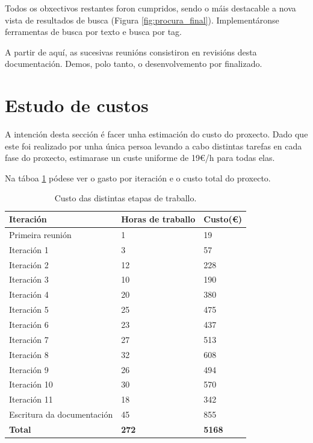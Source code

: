 Todos os obxectivos restantes foron cumpridos, sendo o máis destacable a nova vista de resultados de busca (Figura \ref{fig:procura_final}). Implementáronse ferramentas de busca por texto e busca por tag.

A partir de aquí, as sucesivas reunións consistiron en revisións desta documentación. Demos, polo tanto, o desenvolvemento por finalizado.



\section{Estudo de custos}

A intención desta sección é facer unha estimación do custo do proxecto. Dado que este foi realizado por unha única persoa levando a cabo distintas tarefas en cada fase do proxecto, estimarase un custe uniforme de 19€/h para todas elas. 

Na táboa \ref{tab:custo} pódese ver o gasto por iteración e o custo total do proxecto.

\begin{table}[h]
	\centering
	\begin{tabular}{|p{5cm}|l|l|}
		\hline
		\rowcolor{blue!10}
		Iteración & Horas de traballo & Custo(€)\\
		\hline
		Primeira reunión & 1 &  19\\
		\hline
		Iteración 1 & 3 &  57\\
		\hline
		Iteración 2 & 12 &  228\\
		\hline
		Iteración 3 & 10 &  190\\
		\hline
		Iteración 4 & 20 &  380\\
		\hline
		Iteración 5 & 25 &  475\\
		\hline
		Iteración 6 & 23 &  437\\
		\hline
		Iteración 7 & 27 &  513\\
		\hline
		Iteración 8 & 32 &  608\\
		\hline
		Iteración 9 & 26 &  494\\
		\hline
		Iteración 10 & 30 &  570\\
		\hline
		Iteración 11 &  18 &  342\\
		\hline
		Escritura da documentación & 45 & 855\\
		\hline
		\textbf{Total} & \textbf{272} & \textbf{5168} \\
		\hline
	\end{tabular}
	\caption{Custo das distintas etapas de traballo.}
\label{tab:custo}
\end{table}


